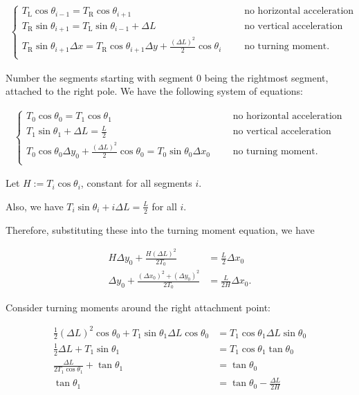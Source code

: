 \documentclass[12pt]{article}
\newcommand{\Tl}{T_{\text{L}}}
\newcommand{\Tr}{T_{\text{R}}}
\begin{document}
\begin{align*}
  \begin{cases}
    \Tl\cos\theta_{i-1} = \Tr\cos\theta_{i+1} ~~~~~~~&\text{no horizontal acceleration}\\
    \Tr\sin\theta_{i+1} = \Tl\sin\theta_{i-1} + \Delta L ~~~~~~~&\text{no vertical acceleration}\\
    \Tr\sin\theta_{i+1}\Delta x = \Tr\cos\theta_{i+1}\Delta y + \frac{(\Delta L)^2}{2}\cos\theta_i ~~~~~~~&\text{no turning moment.}\\
  \end{cases}
\end{align*}

\newpage

Number the segments starting with segment 0 being the rightmost segment, attached to the right
pole. We have the following system of equations:

\begin{align*}
  \begin{cases}
    T_0\cos\theta_0 = T_1\cos\theta_1                               ~~~~~~~&\text{no horizontal acceleration}\\
    T_1\sin\theta_1 + \Delta L = \frac{L}{2}                        ~~~~~~~&\text{no vertical acceleration}\\
    T_0\cos\theta_0\Delta y_0 +
    \frac{(\Delta L)^2}{2} \cos\theta_0 = T_0\sin\theta_0 \Delta x_0 ~~~~~~~&\text{no turning moment.}\\
  \end{cases}
\end{align*}


Let $H := T_i\cos\theta_i$, constant for all segments $i$.

Also, we have $T_i\sin\theta_i + i\Delta L = \frac{L}{2}$ for all $i$.

Therefore, substituting these into the turning moment equation, we have

\begin{align*}
  H\Delta y_0 + \frac{H(\Delta L)^2}{2T_0} &= \frac{L}{2} \Delta x_0 \\
  \Delta y_0 + \frac{(\Delta x_0)^2 + (\Delta y_0)^2}{2T_0} &= \frac{L}{2H} \Delta x_0.
\end{align*}


\newpage

Consider turning moments around the right attachment point:

\begin{align*}
  \frac{1}{2}(\Delta L)^2\cos\theta_0 + T_1\sin\theta_1\Delta L \cos\theta_0 &= T_1\cos\theta_1\Delta L \sin\theta_0\\
  \frac{1}{2}\Delta L + T_1\sin\theta_1 &= T_1\cos\theta_1 \tan\theta_0\\
  \frac{\Delta L}{2T_1\cos\theta_1} + \tan\theta_1 &= \tan\theta_0\\
  \tan\theta_1 &= \tan\theta_0 - \frac{\Delta L}{2H}\\
\end{align*}
\end{document}

